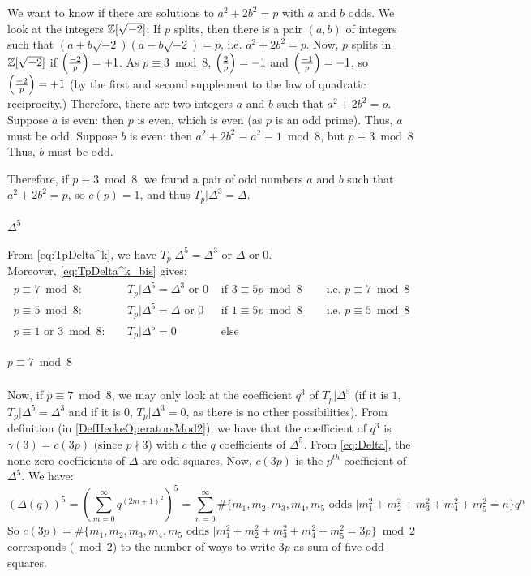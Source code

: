 We want to know if there are solutions to $a^2+2b^2=p$ with $a$ and $b$ odds.
We look at the integers $\mathbb{Z}[\sqrt{-2}]$:
If $p$ splits, then there is a pair $(a,b)$ of integers such that $(a+b\sqrt{-2})(a-b\sqrt{-2})=p$, i.e. $a^2+2b^2=p$.
Now, $p$ splits in $\mathbb{Z}[\sqrt{-2}]$ if $\left( \frac{-2}{p} \right)=+1$.
As $p \equiv 3 \bmod 8$, $\left( \frac{2}{p} \right)=-1$ and $\left( \frac{-1}{p} \right)=-1$, so $\left( \frac{-2}{p} \right)=+1$ (by the first and second supplement to the law of quadratic reciprocity.)
Therefore, there are two integers $a$ and $b$ such that $a^2+2b^2=p$.
Suppose $a$ is even: then $p$ is even, which is even (as $p$ is an odd prime).
Thus, $a$ must be odd.
Suppose $b$ is even: then $a^2+2b^2 \equiv a^2 \equiv 1 \bmod 8$, but $p \equiv 3 \bmod 8$
Thus, $b$ must be odd.

Therefore, if $p \equiv 3 \bmod 8$, we found a pair of odd numbers $a$ and $b$ such that $a^2+2b^2=p$, so $c(p)=1$, and thus $T_p|\Delta^3 = \Delta$.

\paragraph{$\Delta^5$}
From \eqref{eq:TpDelta^k}, we have $T_p|\Delta^5 = \Delta^3 \text{ or } \Delta \text{ or } 0$.\\
Moreover, \eqref{eq:TpDelta^k_bis} gives:
\begin{align*}
	p \equiv 7 \bmod 8: & \quad T_p|\Delta^5 = \Delta^3 \text{ or } 0 & \text{ if } 3 \equiv 5p \bmod 8 & \quad \text{ i.e. } p \equiv 7 \bmod 8 \\
	p \equiv 5 \bmod 8: & \quad T_p|\Delta^5 = \Delta \text{ or } 0 & \text{ if } 1 \equiv 5p \bmod 8 & \quad \text{ i.e. } p \equiv 5 \bmod 8 \\
	p \equiv 1 \text{ or } 3 \bmod 8: & \quad T_p|\Delta^5 = 0 & \text{ else } &
\end{align*}

\subparagraph{$p \equiv 7 \bmod 8$}
Now, if $p \equiv 7 \bmod 8$, we may only look at the coefficient $q^3$ of $T_p|\Delta^5$ (if it is $1$, $T_p|\Delta^5 = \Delta^3$ and if it is $0$, $T_p|\Delta^3 = 0$, as there is no other possibilities).
From definition (in \ref{DefHeckeOperatorsMod2}), we have that the coefficient of $q^3$ is $\gamma(3) = c(3p)$ (since $p \nmid 3$) with $c$ the $q$ coefficients of $\Delta^5$.
From \eqref{eq:Delta}, the none zero coefficients of $\Delta$ are odd squares.
Now, $c(3p)$ is the $p^{th}$ coefficient of $\Delta^5$. We have:
$$
\left( \Delta(q) \right)^5
= \left( \sum_{m=0}^{\infty} q^{(2m+1)^2} \right)^5
= \sum_{n=0}^{\infty} \#\{m_1, m_2, m_3, m_4, m_5 \text{ odds } | m_1^2 + m_2^2 + m_3^2 + m_4^2 + m_5^2 = n\} q^n
$$
So $c(3p) = \#\{m_1, m_2, m_3, m_4, m_5 \text{ odds } | m_1^2 + m_2^2 + m_3^2 + m_4^2 + m_5^2 = 3p\} \bmod 2$ corresponds ($\bmod 2$) to the number of ways to write $3p$ as sum of five odd squares.

